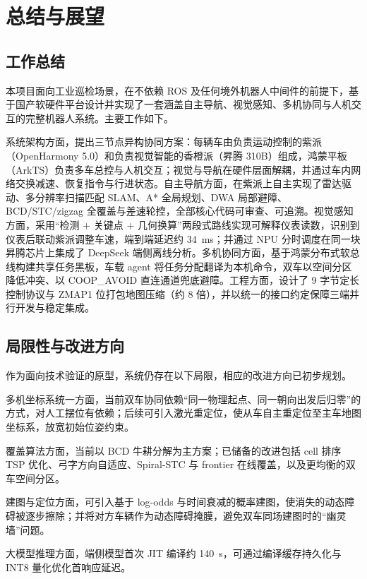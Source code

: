 \chapter{总结与展望}
\label{ch:conclusion}

\section{工作总结}
\label{sec:summary}

本项目面向工业巡检场景，在不依赖 ROS 及任何境外机器人中间件的前提下，基于国产软硬件平台设计并实现了一套涵盖自主导航、视觉感知、多机协同与人机交互的完整机器人系统。主要工作如下。

系统架构方面，提出三节点异构协同方案：每辆车由负责运动控制的紫派（OpenHarmony 5.0）和负责视觉智能的香橙派（昇腾 310B）组成，鸿蒙平板（ArkTS）负责多车总控与人机交互；视觉与导航在硬件层面解耦，并通过车内网络交换减速、恢复指令与行进状态。自主导航方面，在紫派上自主实现了雷达驱动、多分辨率扫描匹配 SLAM、A* 全局规划、DWA 局部避障、BCD/STC/zigzag 全覆盖与差速轮控，全部核心代码可审查、可追溯。视觉感知方面，采用“检测 + 关键点 + 几何换算”两段式路线实现可解释仪表读数，识别到仪表后联动紫派调整车速，端到端延迟约 34~ms；并通过 NPU 分时调度在同一块昇腾芯片上集成了 DeepSeek 端侧离线分析。多机协同方面，基于鸿蒙分布式软总线构建共享任务黑板，车载 agent 将任务分配翻译为本机命令，双车以空间分区降低冲突、以 COOP\_AVOID 直连通道兜底避障。工程方面，设计了 9 字节定长控制协议与 ZMAP1 位打包地图压缩（约 8 倍），并以统一的接口约定保障三端并行开发与稳定集成。

\section{局限性与改进方向}
\label{sec:limitations}

作为面向技术验证的原型，系统仍存在以下局限，相应的改进方向已初步规划。

多机坐标系统一方面，当前双车协同依赖“同一物理起点、同一朝向出发后归零”的方式，对人工摆位有依赖；后续可引入激光重定位，使从车自主重定位至主车地图坐标系，放宽初始位姿约束。

覆盖算法方面，当前以 BCD 牛耕分解为主方案；已储备的改进包括 cell 排序 TSP 优化、弓字方向自适应、Spiral-STC 与 frontier 在线覆盖，以及更均衡的双车空间分区。

建图与定位方面，可引入基于 log-odds 与时间衰减的概率建图，使消失的动态障碍被逐步擦除；并将对方车辆作为动态障碍掩膜，避免双车同场建图时的“幽灵墙”问题。

大模型推理方面，端侧模型首次 JIT 编译约 140~s，可通过编译缓存持久化与 INT8 量化优化首响应延迟。

